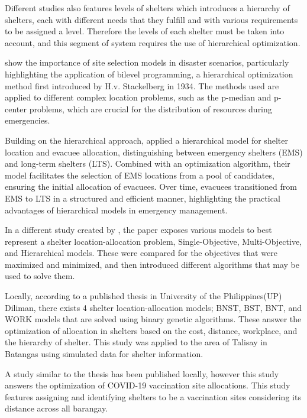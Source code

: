 	Different studies also features levels of shelters which introduces a hierarchy of shelters, each with different needs that they fulfill and with various requirements to be assigned a level. Therefore the levels of each shelter must be taken into account, and this segment of system requires the use of hierarchical optimization.
	
	\textcite{Yunjia2019} show the importance of site selection models in disaster scenarios, particularly highlighting the application of bilevel programming, a hierarchical optimization method first introduced by H.v. Stackelberg in 1934. The methods used are applied to different complex location problems, such as the p-median and p-center problems, which are crucial for the distribution of resources during emergencies. 
	
	Building on the hierarchical approach, \textcite{Xiujuan2019} applied a hierarchical model for shelter location and evacuee allocation, distinguishing between emergency shelters (EMS) and long-term shelters (LTS). Combined with an optimization algorithm, their model facilitates the selection of EMS locations from a pool of candidates, ensuring the initial allocation of evacuees. Over time, evacuees transitioned from EMS to LTS in a structured and efficient manner, highlighting the practical advantages of hierarchical models in emergency management. 
	
	In a different study created by \textcite{Yunjia2019}, the paper exposes various models to best represent a shelter location-allocation problem, Single-Objective, Multi-Objective, and Hierarchical models. These were compared for the objectives that were maximized and minimized, and then introduced different algorithms that may be used to solve them.
	
	Locally, according to a published thesis in University of the Philippines(UP) Diliman, there exists 4 shelter location-allocation models; BNST, BST, BNT, and WORK models that are solved using binary genetic algorithms. These answer the optimization of allocation in shelters based on the cost, distance, workplace, and the hierarchy of shelter. This study was applied to the area of Talisay in Batangas using simulated data for shelter information.
	
	A study similar to the thesis has been published locally, however this study answers the optimization of COVID-19 vaccination site allocations\parencite{Kurt2021}. This study features assigning and identifying shelters to be a vaccination sites considering its distance across all barangay.

